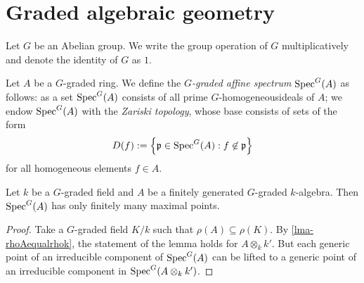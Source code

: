 \section{Graded algebraic geometry}
Let $G$ be an Abelian group. We write the group operation of $G$ multiplicatively and denote the identity of $G$ as $1$.

\begin{definition}
    Let $A$ be a $G$-graded ring. We define the \emph{$G$-graded affine spectrum} $\operatorname{Spec}^G(A)$ as follows: as a set $\operatorname{Spec}^G (A)$ consists of all prime $G$-homogeneousideals of $A$; we endow $\operatorname{Spec}^G(A)$ with the \emph{Zariski topology}, whose base consists of sets of the form 
    \[
        D(f):=\left\{\mathfrak{p}\in \operatorname{Spec}^G(A): f\not\in \mathfrak{p}\right\}
    \]
    for all homogeneous elements $f\in A$.
\end{definition}

\begin{lemma}\label{lma-specggenericpointfinite}
    Let $k$ be a $G$-graded field and $A$ be a finitely generated $G$-graded $k$-algebra. Then $\operatorname{Spec}^G(A)$ has only finitely many maximal points.
\end{lemma}
\begin{proof}
    Take a $G$-graded field $K/k$ such that $\rho(A)\subseteq \rho(K)$. By \cref{lma-rhoAequalrhok}, the statement of the lemma holds for $A\otimes_k k'$. But each generic point of an irreducible component of $\operatorname{Spec}^G(A)$ can be lifted to a generic point of an irreducible component in $\operatorname{Spec}^G(A\otimes_k k')$.
\end{proof}

